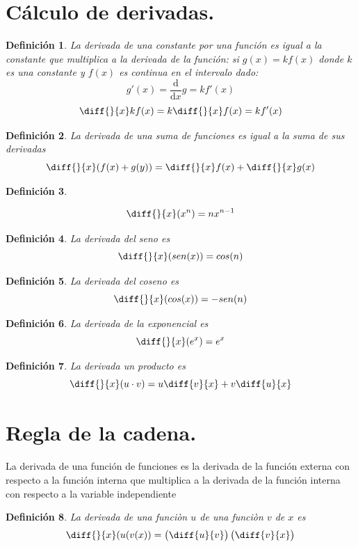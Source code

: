 \documentclass[oneside,spanish,letterpaper]{extbook}
\newtheorem{definition}{Definición}[section]%
\theoremstyle{mythmstyle}
\begin{document}
\section{Cálculo de derivadas.}

\begin{definition}\label{dercons}
La derivada de una constante por una función es igual a la constante que multiplica a la derivada de la función:
si $g(x)=kf(x)$ donde $k$ es una constante y $f(x)$ es continua en el intervalo dado:
$$g'(x)=\frac{\mathrm{d}}{\mathrm{d}x}g=kf'(x)$$
$$\diff{}{x}kf(x)=k\diff{}{x}f(x)=kf'(x)$$
\end{definition}

\begin{definition}\label{dersum}
La derivada de una suma de funciones es igual a la suma de sus derivadas
 $$\diff{}{x}(f(x)+g(y))=\diff{}{x}f(x)+\diff{}{x}g(x)$$
\end{definition}

\begin{definition}\label{derpol}

 $$\diff{}{x}(x^n)=nx^{n-1}$$
\end{definition}


\begin{definition}\label{dersen}
 La derivada del seno es 
 $$\diff{}{x}(sen(x))=cos(n)$$
\end{definition}

\begin{definition}\label{dercos}
 La derivada del coseno es 
 $$\diff{}{x}(cos(x))=-sen(n)$$
\end{definition}

\begin{definition}\label{derexp}
 La derivada de la exponencial es 
 $$\diff{}{x}(e^x)=e^x$$
\end{definition}

\begin{definition}\label{derprod}
 La derivada un producto es 
 $$\diff{}{x}(u\cdot v)=u\diff{v}{x}+v\diff{u}{x}$$
\end{definition}

\section{Regla de la cadena.}
La derivada de una función de funciones es la derivada de la función externa con respecto a la función interna
que multiplica a la derivada de la función interna con respecto a la variable independiente
\begin{definition}\label{regcad}
La derivada de una funciòn $u$ de una funciòn $v$ de $x$ es
 $$\diff{}{x}(u(v(x))=\left(\diff{u}{v}\right)\left(\diff{v}{x}\right)$$
\end{definition}
\end{document}
